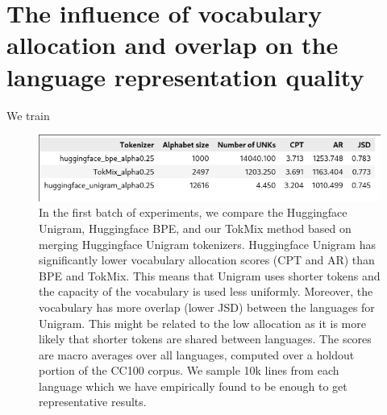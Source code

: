 \section{The influence of vocabulary allocation and overlap on the language representation quality}

We train 



\begin{figure}[H]
    \centering
    \includegraphics[width=\textwidth]{img/temp/20l_metrics.png}
    \caption{In the first batch of experiments, we compare the Huggingface Unigram, Huggingface BPE, and our TokMix method based on merging Huggingface Unigram tokenizers. Huggingface Unigram has significantly lower vocabulary allocation scores (CPT and AR) than BPE and TokMix. This means that Unigram uses shorter tokens and the capacity of the vocabulary is used less uniformly. Moreover, the vocabulary has more overlap (lower JSD) between the languages for Unigram. This might be related to the low allocation as it is more likely that shorter tokens are shared between languages. The scores are macro averages over all languages, computed over a holdout portion of the CC100 corpus. We sample 10k lines from each language which we have empirically found to be enough to get representative results.}
    \label{fig:20l_metrics}
\end{figure}


